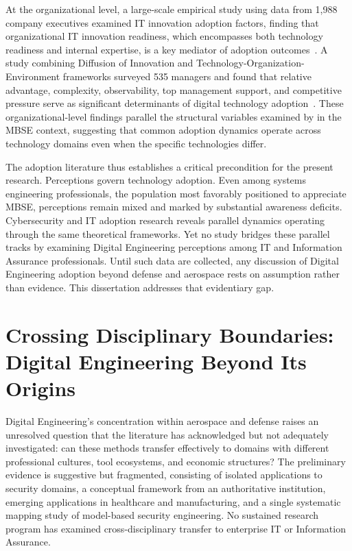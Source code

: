 At the organizational level, a large-scale empirical study using data from 1,988 company executives examined IT innovation adoption factors, finding that organizational IT innovation readiness, which encompasses both technology readiness and internal expertise, is a key mediator of adoption outcomes~\parencite{Ali_2022}. A study combining Diffusion of Innovation and Technology-Organization-Environment frameworks surveyed 535 managers and found that relative advantage, complexity, observability, top management support, and competitive pressure serve as significant determinants of digital technology adoption~\parencite{Shahadat_2023}. These organizational-level findings parallel the structural variables examined by \citeauthor{Henderson_Salado_2024_Org} in the MBSE context, suggesting that common adoption dynamics operate across technology domains even when the specific technologies differ.

The adoption literature thus establishes a critical precondition for the present research. Perceptions govern technology adoption. Even among systems engineering professionals, the population most favorably positioned to appreciate MBSE, perceptions remain mixed and marked by substantial awareness deficits. Cybersecurity and IT adoption research reveals parallel dynamics operating through the same theoretical frameworks. Yet no study bridges these parallel tracks by examining Digital Engineering perceptions among IT and Information Assurance professionals. Until such data are collected, any discussion of Digital Engineering adoption beyond defense and aerospace rests on assumption rather than evidence. This dissertation addresses that evidentiary gap.

\section{Crossing Disciplinary Boundaries: Digital Engineering Beyond Its Origins}

Digital Engineering's concentration within aerospace and defense raises an unresolved question that the literature has acknowledged but not adequately investigated: can these methods transfer effectively to domains with different professional cultures, tool ecosystems, and economic structures? The preliminary evidence is suggestive but fragmented, consisting of isolated applications to security domains, a conceptual framework from an authoritative institution, emerging applications in healthcare and manufacturing, and a single systematic mapping study of model-based security engineering. No sustained research program has examined cross-disciplinary transfer to enterprise IT or Information Assurance.

